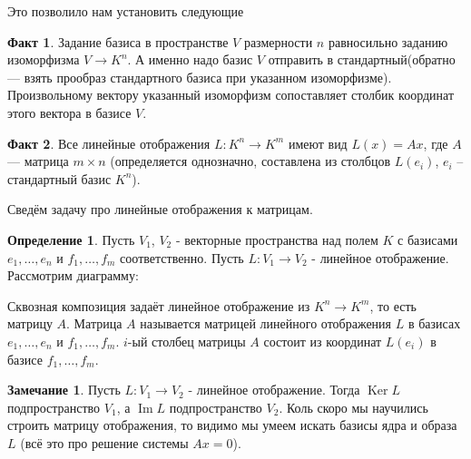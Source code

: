 \documentclass[10pt,a4paper,oneside]{book}
\theoremstyle{definition}
\newtheorem*{rem}{Замечание}
\newtheorem{defn}{Определение}
\newtheorem*{fact}{Факт}
\DeclareMathOperator{\Ker}{Ker}
\newcommand{\im}{\operatorname{Im}}
\begin{document}
Это позволило нам установить следующие 

\begin{fact}
Задание базиса в пространстве $V$ размерности $n$ равносильно заданию изоморфизма $V\to K^n$. А именно надо базис $V$ отправить в стандартный(обратно --- взять прообраз стандартного базиса при указанном изоморфизме). Произвольному вектору  указанный изоморфизм сопоставляет столбик координат этого вектора в базисе $V$.
\end{fact}

\begin{fact}
Все линейные отображения $L\colon K^n \to K^m$ имеют вид $L(x)=Ax$, где $A$ --- матрица $m\times n$ (определяется однозначно, составлена из столбцов $L(e_i)$, $e_i$ -- стандартный базис $K^n$).
\end{fact}

Сведём задачу про линейные отображения к матрицам.
\begin{defn}
Пусть $V_1$, $V_2$ - векторные пространства над полем $K$ с базисами $e_1,\dots, e_n$ и $f_1,\dots, f_m$ соответственно. Пусть $L\colon V_1\to V_2$ - линейное отображение. Рассмотрим диаграмму:

\begin{center}
\end{center}

Сквозная композиция задаёт линейное отображение из $K^n\to K^m$, то есть матрицу $A$. Матрица $A$ называется матрицей линейного отображения $L$ в базисах $e_1,\dots, e_n$ и $f_1,\dots, f_m$. $i$-ый столбец матрицы $A$ состоит из координат $L(e_i)$ в базисе $f_1,\dots, f_m$.
\end{defn}

\begin{rem}
Пусть $L\colon V_1 \to V_2$ - линейное отображение. Тогда $\Ker L$ подпространство $V_1$, а $\im L$ подпространство $V_2$. Коль скоро мы научились строить матрицу отображения, то видимо мы умеем искать базисы ядра и образа $L$ (всё это про решение системы $Ax=0$). 
\end{rem}
\end{document}
